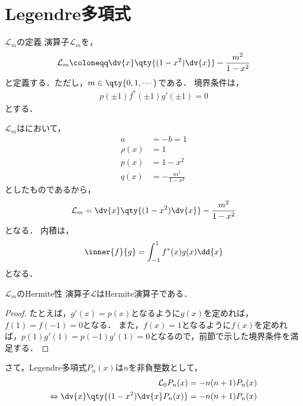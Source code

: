 \documentclass{report}
\begin{document}
    \section{Legendre多項式}
      \begin{mydef}{$\mathcal{L}_m$の定義}{}
        演算子$\mathcal{L}_m$を，
        \begin{align}
          \mathcal{L}_m \coloneqq \dv{x}\qty{(1 - x^2)\dv{x}} - \frac{m^2}{1 - x^2}
        \end{align}
        と定義する．ただし，$m\in \qty{0, 1, \cdots}$である．
        境界条件は，
          \begin{align}
            p(\pm 1)f^*(\pm 1)g'(\pm 1) = 0
          \end{align}
          とする．
      \end{mydef}
      \begin{myrem}{}{}
        $\mathcal{L}_m$はにおいて，
        \begin{align}
          a &= -b = 1 \\ 
          \rho(x) &= 1 \\ 
          p(x) &= 1 - x^2 \\ 
          q(x) &= -\frac{m^2}{1 - x^2}
        \end{align}
        としたものであるから，
        \begin{align}
          \mathcal{L}_m = \dv{x}\qty{(1 - x^2)\dv{x}} - \frac{m^2}{1 - x^2}
        \end{align}
        となる．
        内積は，
        \begin{align}
          \inner{f}{g} = \int_{-1}^{1} f^*(x)g(x) \dd{x} \label{inner-prod-legendre}
        \end{align}
        となる．
      \end{myrem}
      \begin{myprop}{$\mathcal{L}_m$のHermite性}{}
        演算子$\mathcal{L}$はHermite演算子である．
        \tcblower
        \begin{proof}
          たとえば，$g'(x) = p(x)$となるように$g(x)$を定めれば，$f(1) = f(-1) = 0$となる．
          また，$f(x) = 1$となるように$f(x)$を定めれば，$p(1)g'(1) = p(-1)g'(1) = 0$となるので，前節で示した境界条件を満足する．
        \end{proof}
      \end{myprop}
      さて，Legendre多項式$P_n(x)$は$n$を非負整数として，
      \begin{align}
        \mathcal{L}_0P_n(x) &= -n(n + 1) P_n(x) \\ 
        \Leftrightarrow \dv{x}\qty{(1 - x^2)\dv{x}P_n(x)} &= -n(n + 1)P_n(x)\label{legendre-polynominal} 
      \end{align}
\end{document}
